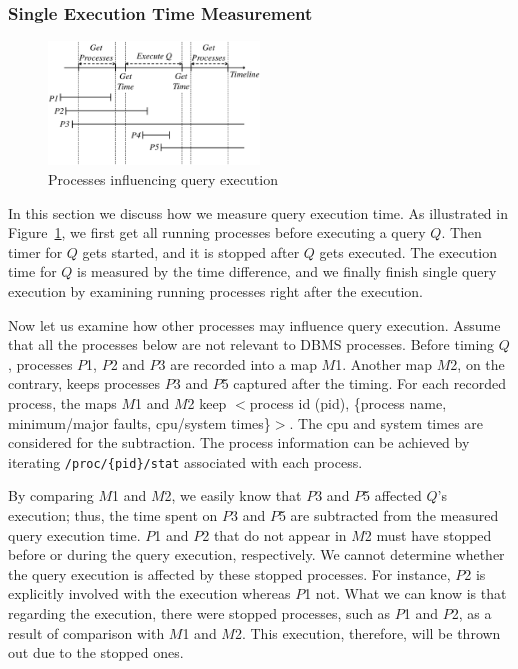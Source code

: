 \subsubsection{Single Execution Time Measurement}\label{sec:qe_time}

\begin{figure}[th]\centering
\includegraphics[width=0.50\textwidth]{figures/time_measurement.eps}
\caption{Processes influencing query execution\label{fig:timing}}
\end{figure}

In this section we discuss how we measure query execution time. 
As illustrated in Figure~\ref{fig:timing}, 
we first get all running processes before executing 
a query $Q$. 
Then timer for $Q$ gets started, and it is stopped after $Q$ gets 
executed. 
The execution time for $Q$ is measured by the time difference, and 
we finally finish single query execution by examining running 
processes right after the execution. 

Now let us examine how other processes may influence query execution. 
Assume that all the processes below are not relevant to DBMS processes.
Before timing $Q$, processes $P$1, $P$2 and $P$3 are recorded into 
a map $M$1. 
Another map $M$2, on the contrary, keeps processes $P$3 and $P$5 
captured after the timing. 
For each recorded process, the maps $M$1 and $M$2 keep 
$<$process id (pid), \{process name, minimum/major faults, 
cpu/system times\}$>$. 
The cpu and system times are considered for the subtraction. 
The process information can be achieved by iterating 
{\tt /proc/\{pid\}/stat} associated with each process. 

By comparing $M$1 and $M$2, we easily know that $P$3 and $P$5 affected 
$Q$'s execution; thus, the time spent on $P$3 and $P$5 are subtracted from 
the measured query execution time. 
$P$1 and $P$2 that do not appear in $M$2 must have stopped 
before or during the query execution, respectively. 
We cannot determine whether the query execution is affected by 
these stopped processes. 
For instance, $P$2 is explicitly involved with the execution whereas 
$P$1 not. 
What we can know is that regarding the execution, there were stopped 
processes, such as $P$1 and $P$2, as a result of comparison with 
$M$1 and $M$2. 
This execution, therefore, will be thrown out due to the stopped ones. 

